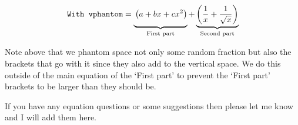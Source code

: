 \documentclass[11pt]{article}
\numberwithin{table}{section}   %
\begin{document}
\begin{equation}
    \texttt{With vphantom} = \underbrace{\vphantom{\left(\frac{1}{x}\right)} \left(a + bx + cx^2\right)}_{\text{First part}} + \underbrace{\left(\frac{1}{x} + \frac{1}{\sqrt{x}}\right)}_{\text{Second part}}  
\end{equation}

Note above that we phantom space not only some random fraction but also the brackets that go with it since they also add to the vertical space. We do this outside of the main equation of the `First part' to prevent the `First part' brackets to be larger than they should be.

If you have any equation questions or some suggestions then please let me know and I will add them here.



\clearpage



%
  
\end{document}

